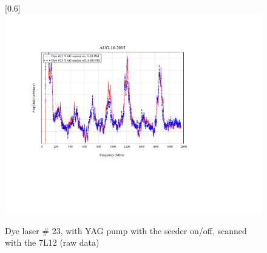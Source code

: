 \begin{figure}
\scalebox{0.8}[0.6]{
\includegraphics[viewport=150 200 300 450, bb=85 160 300 550]
{23-12-seederX/23-12-seederX.pdf}
}
\caption{Dye laser \# 23, with YAG pump with the seeder on/off, scanned with the 7L12 (raw data)}
\label{23-12-seederX}
\end{figure}
